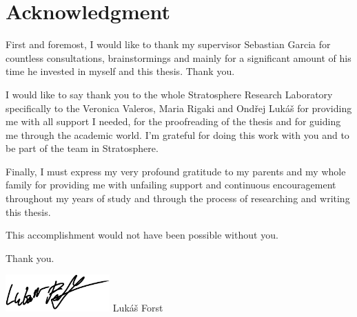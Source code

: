 \vspace*{\fill}

\section*{Acknowledgment}
First and foremost, I would like to thank my supervisor Sebastian Garcia for countless consultations, brainstormings and mainly for a significant amount of his time he invested in myself and this thesis. Thank you.

I would like to say thank you to the whole Stratosphere Research Laboratory specifically to the Veronica Valeros, Maria Rigaki and Ondřej Lukáš for providing me with all support I needed, for the proofreading of the thesis and for guiding me through the academic world.
I'm grateful for doing this work with you and to be part of the team in Stratosphere.

Finally, I must express my very profound gratitude to my parents and my whole family for providing me with unfailing support and continuous encouragement throughout my years of study and through the process of researching and writing this thesis. 

\bigskip \noindent
This accomplishment would not have been possible without you.
  
\bigskip \noindent
Thank you.
  
\bigskip \noindent
\hspace*{0.7\textwidth} \includegraphics[width=0.3\textwidth]{assets/signature.png}
\hspace*{\fill} Lukáš Forst

\thispagestyle{empty}

\cleardoublepage